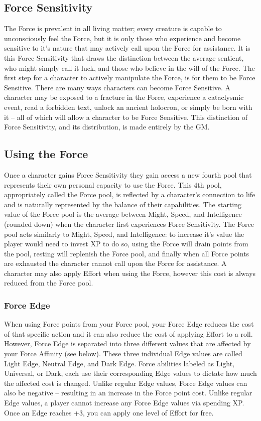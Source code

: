 \documentclass[a4paper,10pt,final,twocolumn,oneside]{book}
\begin{document}
\subsection{Force Sensitivity} %
\label{sub:forceSensitivity}
The Force is prevalent in all living matter; every creature is capable to unconsciously feel the Force, but it is only those who experience and become sensitive to it's nature that may actively call upon the Force for assistance. It is this Force Sensitivity that draws the distinction between the average sentient, who might simply call it luck, and those who believe in the will of the Force. The first step for a character to actively manipulate the Force, is for them to be Force Sensitive. There are many ways characters can become Force Sensitive. A character may be exposed to a fracture in the Force, experience a cataclysmic event, read a forbidden text, unlock an ancient holocron, or simply be born with it -- all of which will allow a character to be Force Sensitive. This distinction of Force Sensitivity, and its distribution, is made entirely by the GM.


\subsection{Using the Force} %
\label{sub:usingForce}
Once a character gains Force Sensitivity they gain access a new fourth pool that represents their own personal capacity to use the Force. This 4th pool, appropriately called the Force pool, is reflected by a character's connection to life and is naturally represented by the balance of their capabilities. The starting value of the Force pool is the average between Might, Speed, and Intelligence (rounded down) when the character first experiences Force Sensitivity. The Force pool acts similarly to Might, Speed, and Intelligence: to increase it's value the player would need to invest XP to do so, using the Force will drain points from the pool, resting will replenish the Force pool, and finally when all Force points are exhausted the character cannot call upon the Force for assistance. A character may also apply Effort when using the Force, however this cost is always reduced from the Force pool.


\subsubsection{Force Edge} %
\label{subsub:Force Edge}
When using Force points from your Force pool, your Force Edge reduces the cost of that specific action and it can also reduce the cost of applying Effort to a roll. However, Force Edge is separated into three different values that are affected by your Force Affinity (see below). These three individual Edge values are called Light Edge, Neutral Edge, and Dark Edge. Force abilities labeled as Light, Universal, or Dark, each use their corresponding Edge values to dictate how much the affected cost is changed. Unlike regular Edge values, Force Edge values can also be negative -- resulting in an increase in the Force point cost. Unlike regular Edge values, a player cannot increase any Force Edge values via spending XP. Once an Edge reaches +3, you can apply one level of Effort for free. 
\end{document}
